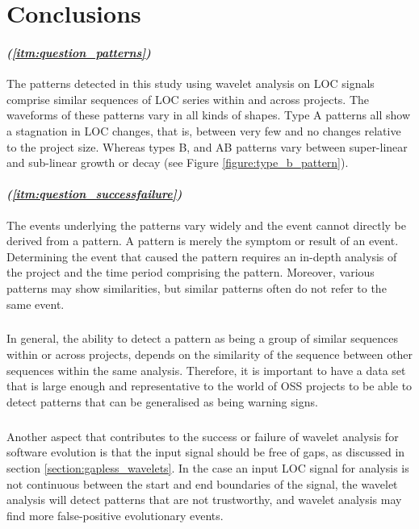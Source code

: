\chapter{Conclusions}
\label{conclusions}

\subsubsection{\textit{\subQuestionOne (\ref{itm:question_patterns})}}
The patterns detected in this study using wavelet analysis on LOC signals
comprise similar sequences of LOC series within and across projects. The
waveforms of these patterns vary in all kinds of shapes. Type A patterns all
show a stagnation in LOC changes, that is, between very few and no changes
relative to the project size. Whereas types B, and AB patterns vary between
super-linear and sub-linear growth or decay (see Figure
\ref{figure:type_b_pattern}).

\subsubsection{\textit{\subQuestionTwo (\ref{itm:question_successfailure})}}
The events underlying the patterns vary widely and the event cannot directly be
derived from a pattern. A pattern is merely the symptom or result of an event.
Determining the event that caused the pattern requires an in-depth analysis of
the project and the time period comprising the pattern. Moreover, various
patterns may show similarities, but similar patterns often do not refer to the
same event.

\paragraph{}
In general, the ability to detect a pattern as being a group of similar
sequences within or across projects, depends on the similarity of the sequence
between other sequences within the same analysis. Therefore, it is important to
have a data set that is large enough and representative to the world of OSS
projects to be able to detect patterns that can be generalised as being warning
signs.

\paragraph{}
Another aspect that contributes to the success or failure of wavelet analysis
for software evolution is that the input signal should be free of gaps, as
discussed in section \ref{section:gapless_wavelets}. In the case an input LOC
signal for analysis is not continuous between the start and end boundaries of
the signal, the wavelet analysis will detect patterns that are not trustworthy,
and wavelet analysis may find more false-positive evolutionary events.

